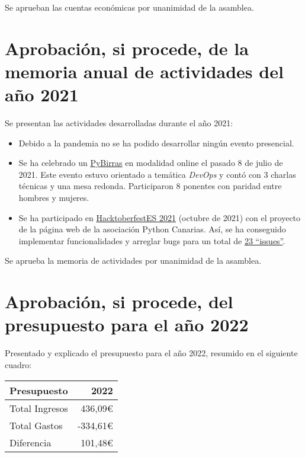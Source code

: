 \documentclass[a4paper,12pt]{article}
\begin{document}
Se aprueban las cuentas económicas por unanimidad de la asamblea.

\section{Aprobación, si procede, de la memoria anual de actividades del año 2021}

Se presentan las actividades desarrolladas durante el año 2021:

\begin{itemize}
    \item Debido a la pandemia no se ha podido desarrollar ningún evento presencial.
    \item Se ha celebrado un \href{https://pythoncanarias.es/events/pybirrasdevops/}{PyBirras} en modalidad online el pasado 8 de julio de 2021. Este evento estuvo orientado a temática \textit{DevOps} y contó con 3 charlas técnicas y una mesa redonda. Participaron 8 ponentes con paridad entre hombres y mujeres.
    \item Se ha participado en \href{https://hacktoberfestes.dev/#proyectos}{HacktoberfestES 2021} (octubre de 2021) con el proyecto de la página web de la asociación Python Canarias. Así, se ha conseguido implementar funcionalidades y arreglar bugs para un total de \href{https://github.com/pythoncanarias/pycan-web/pulls?q=is%3Apr+is%3Aclosed+label%3Ahacktoberfest}{23 ``issues''}.
\end{itemize}

Se aprueba la memoria de actividades por unanimidad de la asamblea.

\section{Aprobación, si procede, del presupuesto para el año 2022}

Presentado y explicado el presupuesto para el año 2022, resumido
en el siguiente cuadro:

\begin{center}
    \begin{tabular}{ | l | r | }
        \hline
        \textbf{Presupuesto} & \textbf{2022} \\ 
        \hline
        Total Ingresos & 436,09\euro \\  
        \hline
        Total Gastos & -334,61\euro \\  
        \hline
        \hline
        Diferencia & 101,48\euro \\  
        \hline
    \end{tabular}
\end{center}
\end{document}
